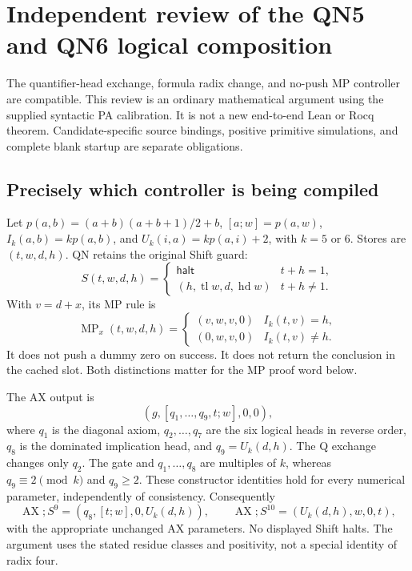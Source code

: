 \section{Independent review of the QN5 and QN6 logical composition}

The quantifier-head exchange, formula radix change, and no-push MP controller
are compatible. This review is an ordinary mathematical argument using the
supplied syntactic PA calibration. It is not a new end-to-end Lean or Rocq
theorem. Candidate-specific source bindings, positive primitive simulations,
and complete blank startup are separate obligations.

\subsection{Precisely which controller is being compiled}
Let $p(a,b)=(a+b)(a+b+1)/2+b$, $[a;w]=p(a,w)$,
$I_k(a,b)=kp(a,b)$, and $U_k(i,a)=kp(a,i)+2$, with $k=5$ or $6$.
Stores are $(t,w,d,h)$. QN retains the original Shift guard:
\[
 S(t,w,d,h)=\begin{cases}\mathsf{halt}&t+h=1,\\
 (h,\operatorname{tl}w,d,\operatorname{hd}w)&t+h\ne1.
 \end{cases}
\]
With $v=d+x$, its MP rule is
\[
 \operatorname{MP}_x(t,w,d,h)=
 \begin{cases}(v,w,v,0)&I_k(t,v)=h,\\(0,w,v,0)&I_k(t,v)\ne h.
 \end{cases}
\]
It does not push a dummy zero on success. It does not return the conclusion
in the cached slot. Both distinctions matter for the MP proof word below.

The AX output is
\[
 (g,[q_1,\ldots,q_9,t;w],0,0),
\]
where $q_1$ is the diagonal axiom, $q_2,\ldots,q_7$ are the six logical
heads in reverse order, $q_8$ is the dominated implication head, and
$q_9=U_k(d,h)$. The Q exchange changes only $q_2$.
The gate and $q_1,\ldots,q_8$ are multiples of $k$, whereas
$q_9\equiv2\pmod k$ and $q_9\ge2$. These constructor identities hold
for every numerical parameter, independently of consistency. Consequently
\[
 \operatorname{AX};S^9=(q_8,[t;w],0,U_k(d,h)),\qquad
 \operatorname{AX};S^{10}=(U_k(d,h),w,0,t),
\]
with the appropriate unchanged AX parameters. No displayed Shift halts.
The argument uses the stated residue classes and positivity, not a special
identity of radix four.

